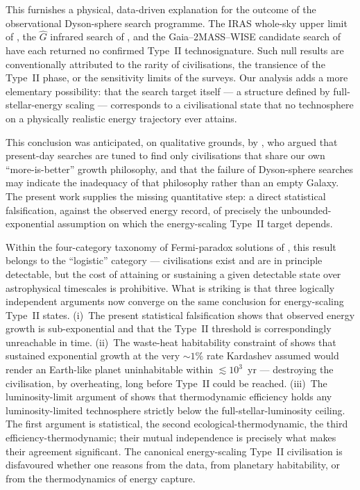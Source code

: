 This furnishes a physical, data-driven explanation for the outcome of the observational
Dyson-sphere search programme. The IRAS whole-sky upper limit of \citet{Carrigan2009},
the $\hat{G}$ infrared search of \citet{Wright2014}, and the Gaia--2MASS--WISE candidate
search of \citet{Suazo2024} have each returned no confirmed Type~II technosignature. Such
null results are conventionally attributed to the rarity of civilisations, the transience
of the Type~II phase, or the sensitivity limits of the surveys. Our analysis adds a more
elementary possibility: that the search target itself --- a structure defined by
full-stellar-energy scaling --- corresponds to a civilisational state that no technosphere
on a physically realistic energy trajectory ever attains.

This conclusion was anticipated, on qualitative grounds, by \citet{Ivanov2020}, who
argued that present-day searches are tuned to find only civilisations that share our own
``more-is-better'' growth philosophy, and that the failure of Dyson-sphere searches may
indicate the inadequacy of that philosophy rather than an empty Galaxy. The present work
supplies the missing quantitative step: a direct statistical falsification, against the
observed energy record, of precisely the unbounded-exponential assumption on which the
energy-scaling Type~II target depends.

Within the four-category taxonomy of Fermi-paradox solutions of \citet{Cirkovic2018},
this result belongs to the ``logistic'' category --- civilisations exist and are in
principle detectable, but the cost of attaining or sustaining a given detectable state
over astrophysical timescales is prohibitive. What is striking is that three logically
independent arguments now converge on the same conclusion for energy-scaling Type~II
states. (i)~The present statistical falsification shows that observed energy growth is
sub-exponential and that the Type~II threshold is correspondingly unreachable in time.
(ii)~The waste-heat habitability constraint of \citet{BalbiLingam2025} shows that
sustained exponential growth at the very $\sim1\%$ rate Kardashev assumed would render an
Earth-like planet uninhabitable within $\lesssim10^3$~yr --- destroying the civilisation,
by overheating, long before Type~II could be reached. (iii)~The luminosity-limit argument
of \citet{HaqqMisra2025b} shows that thermodynamic efficiency holds any
luminosity-limited technosphere strictly below the full-stellar-luminosity ceiling. The
first argument is statistical, the second ecological-thermodynamic, the third
efficiency-thermodynamic; their mutual independence is precisely what makes their
agreement significant. The canonical energy-scaling Type~II civilisation is disfavoured
whether one reasons from the data, from planetary habitability, or from the thermodynamics
of energy capture.

